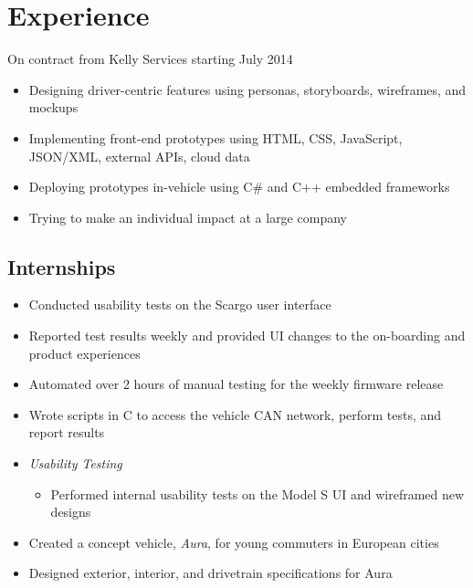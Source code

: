 \documentclass[10pt,a4paper,sans]{moderncv}        %
\begin{document}
\makecvtitle


\section{Experience}
{On contract from Kelly Services starting July 2014}
{{}%
\begin{itemize} 
	\item Designing driver-centric features using personas, storyboards, wireframes, and mockups 
	\item  Implementing front-end prototypes using HTML, CSS, JavaScript, JSON/XML, external APIs, cloud data
	\item  Deploying prototypes in-vehicle using C\# and C++ embedded frameworks
	\item Trying to make an individual impact at a large company
\end{itemize}}
\bigskip
\subsection{Internships}
{{}%
\begin{itemize} 
	\item  Conducted usability tests on the Scargo user interface
	\item  Reported test results weekly and provided UI changes to the on-boarding and product experiences
\end{itemize}}

{{}%
\begin{itemize} 
	\item  Automated over 2 hours of manual testing for the weekly firmware release
	\item  Wrote scripts in C to access the vehicle CAN network, perform tests, and report results
	\smallskip
	\item \textit{Usability Testing}
		\begin{itemize} 
			\item  Performed internal usability tests on the Model S UI and wireframed new designs
		\end{itemize}
\end {itemize}}

{{}%
\begin{itemize} 
	\item  Created a concept vehicle, {\emph{Aura}}, for young commuters in European cities
	\item   Designed exterior, interior, and drivetrain specifications for Aura
\end{itemize}}
\end{document}
